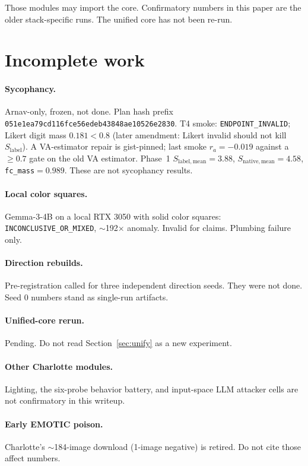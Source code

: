 \documentclass{article}
\begin{document}
Those modules may import the core. Confirmatory numbers in this paper are the older stack-specific runs. The unified core has not been re-run.

\section{Incomplete work}
\label{sec:incomplete}

\paragraph{Sycophancy.}
Arnav-only, frozen, not done. Plan hash prefix \texttt{051e1ea79cd116fce56edeb43848ae10526e2830}. T4 smoke: \texttt{ENDPOINT\_INVALID}; Likert digit mass $0.181<0.8$ (later amendment: Likert invalid should not kill $S_{\mathrm{label}}$). A VA-estimator repair is gist-pinned; last smoke $r_a=-0.019$ against a $\ge 0.7$ gate on the old VA estimator. Phase~1 $S_{\mathrm{label,mean}}=3.88$, $S_{\mathrm{native,mean}}=4.58$, \texttt{fc\_mass}$=0.989$. These are not sycophancy results.

\paragraph{Local color squares.}
Gemma-3-4B on a local RTX 3050 with solid color squares: \texttt{INCONCLUSIVE\_OR\_MIXED}, $\sim$192$\times$ anomaly. Invalid for claims. Plumbing failure only.

\paragraph{Direction rebuilds.}
Pre-registration called for three independent direction seeds. They were not done. Seed 0 numbers stand as single-run artifacts.

\paragraph{Unified-core rerun.}
Pending. Do not read Section~\ref{sec:unify} as a new experiment.

\paragraph{Other Charlotte modules.}
Lighting, the six-probe behavior battery, and input-space LLM attacker cells are not confirmatory in this writeup.

\paragraph{Early EMOTIC poison.}
Charlotte's $\sim$184-image download (1-image negative) is retired. Do not cite those affect numbers.
\end{document}
